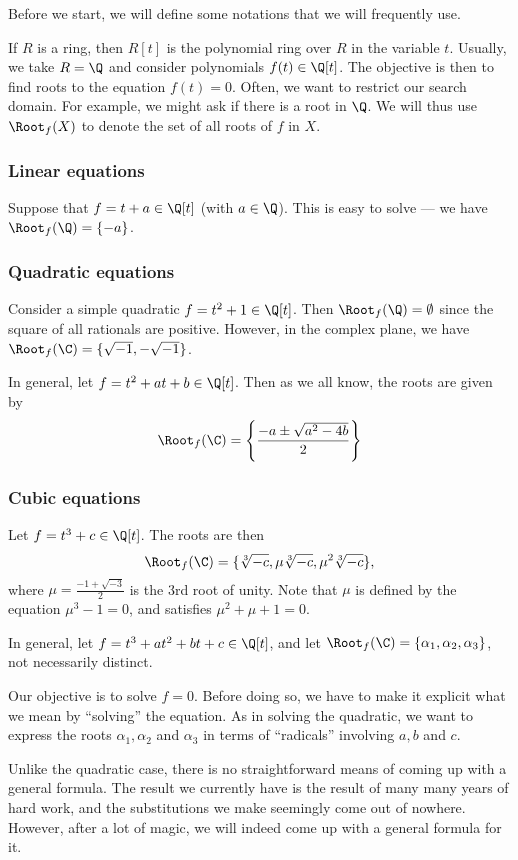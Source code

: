 \documentclass[a4paper]{article}
\begin{document}
Before we start, we will define some notations that we will frequently use.

If $R$ is a ring, then $R[t]$ is the polynomial ring over $R$ in the variable $t$. Usually, we take $R = \Q$ and consider polynomials $f(t) \in \Q[t]$. The objective is then to find roots to the equation $f(t) = 0$. Often, we want to restrict our search domain. For example, we might ask if there is a root in $\Q$. We will thus use $\Root_f(X)$ to denote the set of all roots of $f$ in $X$.

\subsubsection*{Linear equations}
Suppose that $f = t + a \in \Q[t]$ (with $a\in \Q$). This is easy to solve --- we have $\Root_f(\Q) = \{-a\}$.

\subsubsection*{Quadratic equations}
Consider a simple quadratic $f = t^2 + 1 \in \Q[t]$. Then $\Root_f(\Q) = \emptyset$ since the square of all rationals are positive. However, in the complex plane, we have $\Root_f(\C) = \{\sqrt{-1}, -\sqrt{-1}\}$.

In general, let $f = t^2 + at + b\in \Q[t]$. Then as we all know, the roots are given by
\[
  \Root_f(\C) = \left\{\frac{-a \pm \sqrt{a^2 - 4b}}{2}\right\}
\]
\subsubsection*{Cubic equations}
Let $f = t^3 + c\in \Q[t]$. The roots are then
\[
  \Root_f(\C) = \{\sqrt[3]{-c}, \mu\sqrt[3]{-c}, \mu^2 \sqrt[3]{-c}\},
\]
where $\mu = \frac{-1 + \sqrt{-3}}{2}$ is the 3rd root of unity. Note that $\mu$ is defined by the equation $\mu^3 - 1 = 0$, and satisfies $\mu^2 + \mu + 1 = 0$.

In general, let $f = t^3 + at^2 + bt + c \in \Q[t]$, and let $\Root_f(\C) = \{\alpha_1, \alpha_2, \alpha_3\}$, not necessarily distinct.

Our objective is to solve $f = 0$. Before doing so, we have to make it explicit what we mean by ``solving'' the equation. As in solving the quadratic, we want to express the roots $\alpha_1, \alpha_2$ and $\alpha_3$ in terms of ``radicals'' involving $a, b$ and $c$.

Unlike the quadratic case, there is no straightforward means of coming up with a general formula. The result we currently have is the result of many many years of hard work, and the substitutions we make seemingly come out of nowhere. However, after a lot of magic, we will indeed come up with a general formula for it.
\end{document}
